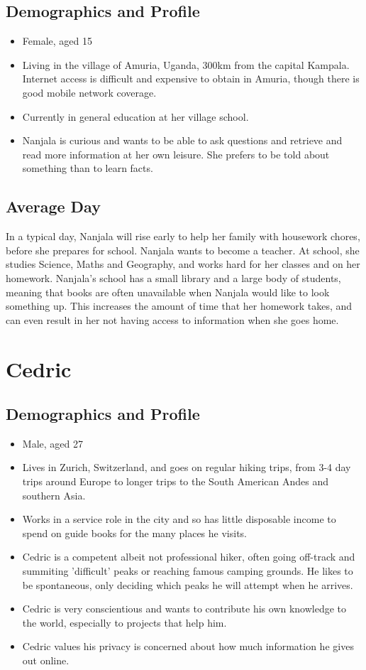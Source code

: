 \documentclass[authoryearcitations]{UoYCSproject}
\begin{document}
\subsection{Demographics and Profile}
\begin{itemize}
  \item Female, aged 15
  \item Living in the village of Amuria, Uganda, 300km from the capital Kampala.  Internet access is difficult and expensive to obtain in Amuria, though there is good mobile network coverage.
  \item Currently in general education at her village school.
  \item Nanjala is curious and wants to be able to ask questions and retrieve and read more information at her own leisure.  She prefers to be told about something than to learn facts.
\end{itemize}
\subsection{Average Day}
In a typical day, Nanjala will rise early to help her family with housework chores, before she prepares for school.  Nanjala wants to become a teacher.  At school, she studies Science, Maths and Geography, and works hard for her classes and on her homework.  Nanjala's school has a small library and a large body of students, meaning that books are often unavailable when Nanjala would like to look something up.  This increases the amount of time that her homework takes, and can even result in her not having access to information when she goes home.

\newpage
\section{Cedric}
\subsection{Demographics and Profile}
\begin{itemize}
  \item Male, aged 27
  \item Lives in Zurich, Switzerland, and goes on regular hiking trips, from 3-4 day trips around Europe to longer trips to the South American Andes and southern Asia.
  \item Works in a service role in the city and so has little disposable income to spend on guide books for the many places he visits.
  \item Cedric is a competent albeit not professional hiker, often going off-track and summiting 'difficult' peaks or reaching famous camping grounds.  He likes to be spontaneous, only deciding which peaks he will attempt when he arrives.
  \item Cedric is very conscientious and wants to contribute his own knowledge to the world, especially to projects that help him.
  \item Cedric values his privacy is concerned about how much information he gives out online.
\end{itemize}
\end{document}
